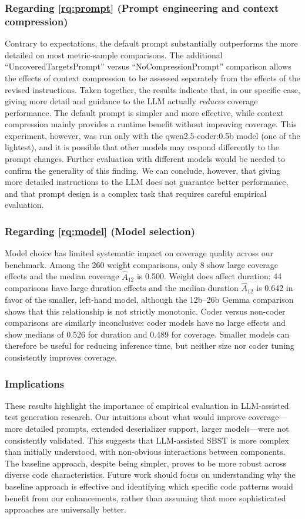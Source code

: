 \documentclass{article}
\begin{document}
\subsubsection*{Regarding \ref{rq:prompt} (Prompt engineering and context compression)}
Contrary to expectations, the default prompt substantially outperforms the more detailed on most metric-sample comparisons. The additional ``UncoveredTargetsPrompt'' versus ``NoCompressionPrompt'' comparison allows the effects of context compression to be assessed separately from the effects of the revised instructions. Taken together, the results indicate that, in our specific case, giving more detail and guidance to the LLM actually \emph{reduces} coverage performance. The default prompt is simpler and more effective, while context compression mainly provides a runtime benefit without improving coverage. This experiment, however, was run only with the qwen2.5-coder:0.5b model (one of the lightest), and it is possible that other models may respond differently to the prompt changes. Further evaluation with different models would be needed to confirm the generality of this finding. We can conclude, however, that giving more detailed instructions to the LLM does not guarantee better performance, and that prompt design is a complex task that requires careful empirical evaluation.

\subsubsection*{Regarding \ref{rq:model} (Model selection)}
Model choice has limited systematic impact on coverage quality across our benchmark. Among the 260 weight comparisons, only 8 show large coverage effects and the median coverage $\hat{A}_{12}$ is 0.500. Weight does affect duration: 44 comparisons have large duration effects and the median duration $\hat{A}_{12}$ is 0.642 in favor of the smaller, left-hand model, although the 12b--26b Gemma comparison shows that this relationship is not strictly monotonic. Coder versus non-coder comparisons are similarly inconclusive: coder models have no large effects and show medians of 0.526 for duration and 0.489 for coverage. Smaller models can therefore be useful for reducing inference time, but neither size nor coder tuning consistently improves coverage.

\subsubsection*{Implications}
These results highlight the importance of empirical evaluation in LLM-assisted test generation research. Our intuitions about what would improve coverage—more detailed prompts, extended deserializer support, larger models—were not consistently validated. This suggests that LLM-assisted SBST is more complex than initially understood, with non-obvious interactions between components. The baseline approach, despite being simpler, proves to be more robust across diverse code characteristics. Future work should focus on understanding why the baseline approach is effective and identifying which specific code patterns would benefit from our enhancements, rather than assuming that more sophisticated approaches are universally better.
\end{document}
